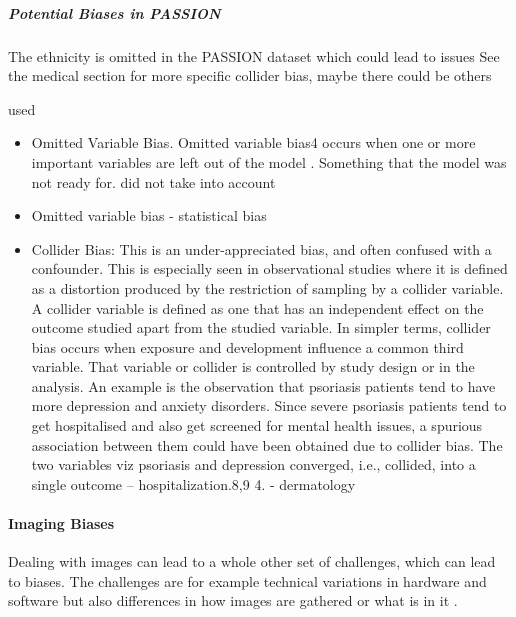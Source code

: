 \begin{refsection}
		
		\subparagraph{Potential Biases in PASSION}
		The ethnicity is omitted in the PASSION dataset which could lead to issues
		See the medical section for more specific collider bias, maybe there could be others
		
		\rawcitationstart
		used
		\begin{itemize}
			\rawcitationusedstart
			\item Omitted Variable Bias. Omitted variable bias4 occurs when one or more important variables are left out of the model \autocites{M38_Clarke_2005}{M131_Riegg_2008}\autocite{M114_Mustard_2003}. Something that the model was not ready for\autocite{Mehrabi_2021}. did not take into account \autocite{Mehrabi_2021}
			\item Omitted variable bias \autocites{Mester_2022}{Mester_2017} - statistical bias
			\item Collider Bias: This is an under-appreciated bias, and often confused with a confounder. This is especially seen in observational studies where it is defined as a distortion produced by the restriction of sampling by a collider variable. A collider variable is defined as one that has an independent effect on the outcome studied apart from the studied variable. In simpler terms, collider bias occurs when exposure and development influence a common third variable. That variable or collider is controlled by study design or in the analysis. An example is the observation that psoriasis patients tend to have more depression and anxiety disorders. Since severe psoriasis patients tend to get hospitalised and also get screened for mental health issues, a spurious association between them could have been obtained due to collider bias. The two variables viz psoriasis and depression converged, i.e., collided, into a single outcome – hospitalization.8,9 4. \autocite{Chakraborty_2024} - dermatology
			\rawcitationusedend
		\end{itemize}
		\rawcitationend
		
		
		\paragraph{Imaging Biases}
		Dealing with images can lead to a whole other set of challenges, which can lead to biases. The challenges are for example technical variations in hardware and software but also differences in how images are gathered or what is in it \autocite{Young_2020}.
		

\end{refsection}
